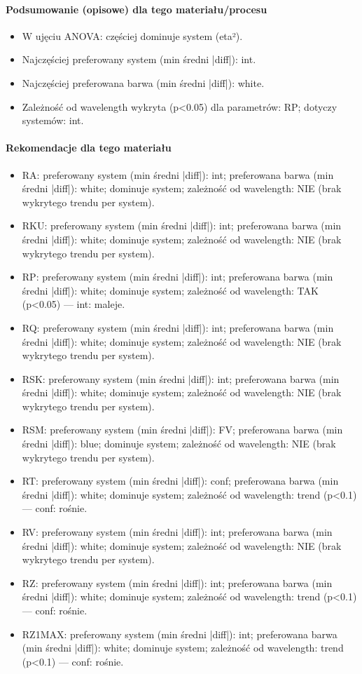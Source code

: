 \documentclass[
  10pt,
]{article}
\begin{document}
\paragraph{Podsumowanie (opisowe) dla tego materiału/procesu}
\begin{itemize}
\item W ujęciu ANOVA: częściej dominuje system (eta²).
\item Najczęściej preferowany system (min średni |diff|): int.
\item Najczęściej preferowana barwa (min średni |diff|): white.
\item Zależność od wavelength wykryta (p<0.05) dla parametrów: RP; dotyczy systemów: int.
\end{itemize}
\paragraph{Rekomendacje dla tego materiału}
\begin{itemize}
\item RA: preferowany system (min średni |diff|): int; preferowana barwa (min średni |diff|): white; dominuje system; zależność od wavelength: NIE (brak wykrytego trendu per system).
\item RKU: preferowany system (min średni |diff|): int; preferowana barwa (min średni |diff|): white; dominuje system; zależność od wavelength: NIE (brak wykrytego trendu per system).
\item RP: preferowany system (min średni |diff|): int; preferowana barwa (min średni |diff|): white; dominuje system; zależność od wavelength: TAK (p<0.05) — int: maleje.
\item RQ: preferowany system (min średni |diff|): int; preferowana barwa (min średni |diff|): white; dominuje system; zależność od wavelength: NIE (brak wykrytego trendu per system).
\item RSK: preferowany system (min średni |diff|): int; preferowana barwa (min średni |diff|): white; dominuje system; zależność od wavelength: NIE (brak wykrytego trendu per system).
\item RSM: preferowany system (min średni |diff|): FV; preferowana barwa (min średni |diff|): blue; dominuje system; zależność od wavelength: NIE (brak wykrytego trendu per system).
\item RT: preferowany system (min średni |diff|): conf; preferowana barwa (min średni |diff|): white; dominuje system; zależność od wavelength: trend (p<0.1) — conf: rośnie.
\item RV: preferowany system (min średni |diff|): int; preferowana barwa (min średni |diff|): white; dominuje system; zależność od wavelength: NIE (brak wykrytego trendu per system).
\item RZ: preferowany system (min średni |diff|): int; preferowana barwa (min średni |diff|): white; dominuje system; zależność od wavelength: trend (p<0.1) — conf: rośnie.
\item RZ1MAX: preferowany system (min średni |diff|): int; preferowana barwa (min średni |diff|): white; dominuje system; zależność od wavelength: trend (p<0.1) — conf: rośnie.
\end{itemize}
\end{document}
